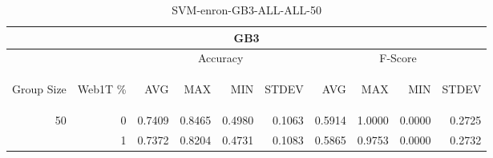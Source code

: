 \begin{center}
\begin{table}[htbp] 
 \begin{center}
\begin{tabular}{ | r | r | r | r | r | r | r | r | r | r |}
\hline
\multicolumn{10}{|c|}{GB3}\\
\hline
 & & \multicolumn{4}{|c|}{Accuracy} & \multicolumn{4}{|c|}{F-Score}\\ \cline{3-10}
\begin{sideways}Group Size\end{sideways} & \begin{sideways}Web1T \%\end{sideways} & \begin{sideways}AVG\end{sideways} & \begin{sideways}MAX\end{sideways} & \begin{sideways}MIN\end{sideways} & \begin{sideways}STDEV\end{sideways} & \begin{sideways}AVG\end{sideways} & \begin{sideways}MAX\end{sideways} & \begin{sideways}MIN\end{sideways} & \begin{sideways}STDEV\end{sideways}\\
\hline
\multirow{1}{*}{50}
 & 0 & 0.7409 & 0.8465 & 0.4980 & 0.1063 & 0.5914 & 1.0000 & 0.0000 & 0.2725\\ \cline{2-10}
 & 1 & 0.7372 & 0.8204 & 0.4731 & 0.1083 & 0.5865 & 0.9753 & 0.0000 & 0.2732\\ \cline{2-10}
\hline
\end{tabular}
\caption{SVM-enron-GB3-ALL-ALL-50}
\label{table:SVM-enron-GB3-ALL-ALL-50}
\end{center}
 \end{table}
\end{center}

